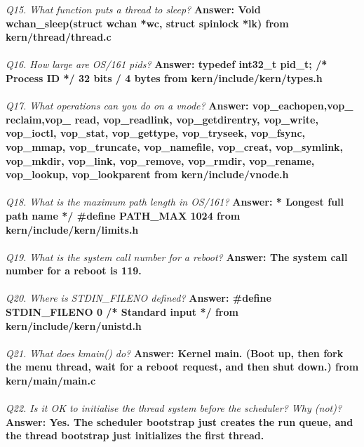 \documentclass[11pt, english]{article}
\begin{document}
\textit{Q15. What function puts a thread to sleep?}\newline
\textbf{Answer: Void wchan\_sleep(struct wchan *wc, struct spinlock *lk)
	from kern/thread/thread.c
	}\\ \\
\textit{Q16. How large are OS/161 pids?}\newline
\textbf{Answer: typedef int32\_t pid\_t; /* Process ID */
	32 bits / 4 bytes from kern/include/kern/types.h
	}\\ \\
\textit{Q17. What operations can you do on a vnode?}\newline %
\textbf{Answer: vop\_eachopen,vop\_ reclaim,vop\_ read, vop\_readlink, vop\_getdirentry, vop\_write, vop\_ioctl, vop\_stat, vop\_gettype, vop\_tryseek, vop\_fsync, vop\_mmap, vop\_truncate, vop\_namefile, vop\_creat, vop\_symlink, vop\_mkdir, vop\_link, vop\_remove, vop\_rmdir, vop\_rename, vop\_lookup, vop\_lookparent
	from kern/include/vnode.h
	}\\ \\ %
\textit{Q18. What is the maximum path length in OS/161?}\newline
\textbf{Answer: * Longest full path name */ \#define PATH\_MAX 1024 
	from kern/include/kern/limits.h
	}\\ \\
\textit{Q19. What is the system call number for a reboot?}\newline
\textbf{Answer: The system call number for a reboot is 119.
	}\\ \\
\textit{Q20. Where is STDIN\_FILENO defined?}\newline
\textbf{Answer: \#define STDIN\_FILENO 0 /* Standard input */ 
	from kern/include/kern/unistd.h
	}\\ \\
\textit{Q21. What does kmain() do?}\newline
\textbf{Answer: Kernel main. (Boot up, then fork the menu thread, wait for a reboot request, and then shut down.)
	from kern/main/main.c
	}\\ \\
\textit{Q22. Is it OK to initialise the thread system before the scheduler? Why (not)?}\newline
\textbf{Answer: Yes. The scheduler bootstrap just creates the run queue, and the thread bootstrap just initializes the first thread.}\\ \\
\end{document}

